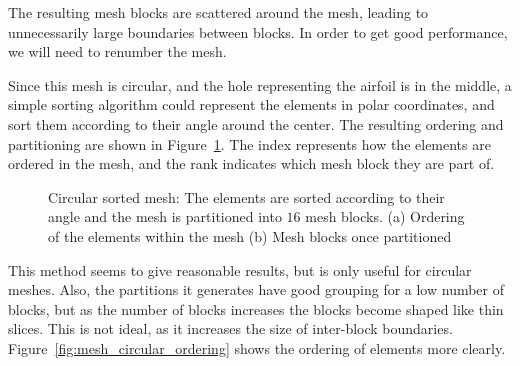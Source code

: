 The resulting mesh blocks are scattered around the mesh, leading to unnecessarily large boundaries
between blocks. In order to get good performance, we will need to renumber the mesh. 

Since this mesh is circular, and the hole representing the airfoil is in the middle, a simple
sorting algorithm could represent the elements in polar coordinates, and sort them according to
their angle around the center. The resulting ordering and partitioning are shown in
Figure~\ref{fig:mesh_circular}. The index represents how the elements are ordered in the mesh, and
the rank indicates which mesh block they are part of.

\begin{figure}[H]
	\centering
	\caption{Circular sorted mesh: The elements are sorted according to their angle and the mesh is partitioned into \(16\) mesh blocks. (a) Ordering of the elements within the mesh (b) Mesh blocks once partitioned}\label{fig:mesh_circular}
\end{figure}

This method seems to give reasonable results, but is only useful for circular meshes. Also, the
partitions it generates have good grouping for a low number of blocks, but as the number of blocks
increases the blocks become shaped like thin slices. This is not ideal, as it increases the size of
inter-block boundaries. Figure~\ref{fig:mesh_circular_ordering} shows the ordering of elements more
clearly.

